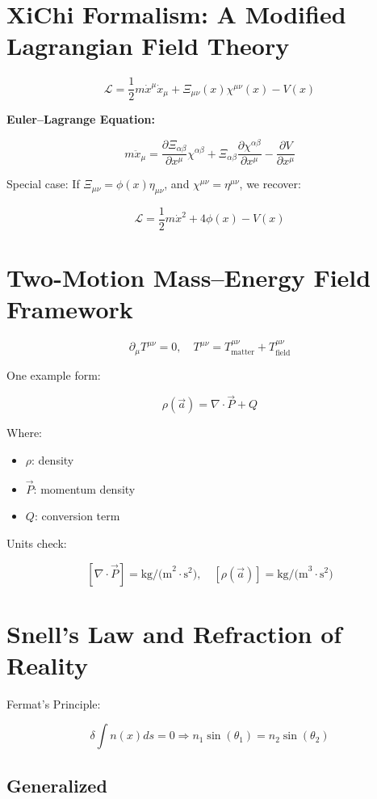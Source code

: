 \documentclass[12pt]{article}
\begin{document}
\section{XiChi Formalism: A Modified Lagrangian Field Theory}

\[
\mathcal{L} = \frac{1}{2} m \dot{x}^\mu \dot{x}_\mu + \Xi_{\mu\nu}(x) \chi^{\mu\nu}(x) - V(x)
\]

\textbf{Euler–Lagrange Equation:}

\[
m \ddot{x}_\mu = \frac{\partial \Xi_{\alpha\beta}}{\partial x^\mu} \chi^{\alpha\beta}
+ \Xi_{\alpha\beta} \frac{\partial \chi^{\alpha\beta}}{\partial x^\mu}
- \frac{\partial V}{\partial x^\mu}
\]

Special case:
If \( \Xi_{\mu\nu} = \phi(x) \eta_{\mu\nu} \), and \( \chi^{\mu\nu} = \eta^{\mu\nu} \), we recover:

\[
\mathcal{L} = \frac{1}{2} m \dot{x}^2 + 4\phi(x) - V(x)
\]

\section{Two-Motion Mass–Energy Field Framework}

\[
\partial_\mu T^{\mu\nu} = 0, \quad T^{\mu\nu} = T_{\text{matter}}^{\mu\nu} + T_{\text{field}}^{\mu\nu}
\]

One example form:

\[
\rho(\vec{a}) = \nabla \cdot \vec{P} + Q
\]

Where:
\begin{itemize}
\item \( \rho \): density
\item \( \vec{P} \): momentum density
\item \( Q \): conversion term
\end{itemize}

Units check:

\[
[\nabla \cdot \vec{P}] = \text{kg/(m}^2\cdot\text{s}^2), \quad [\rho(\vec{a})] = \text{kg/(m}^3\cdot\text{s}^2)
\]

\section{Snell’s Law and Refraction of Reality}

Fermat's Principle:

\[
\delta \int n(x) ds = 0 \Rightarrow n_1 \sin(\theta_1) = n_2 \sin(\theta_2)
\]

\subsection*{Generalized}
\end{document}
